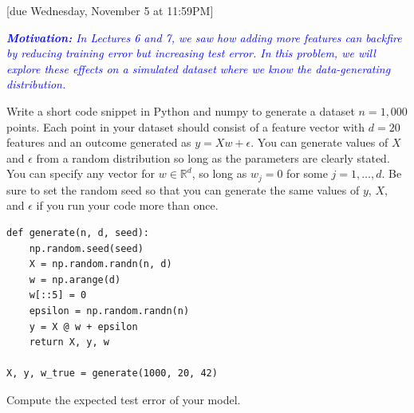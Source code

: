 \documentclass{article}
\newcommand{\R}{\mathbb{R}}
\begin{document}
[due Wednesday, November 5 at 11:59PM]

\begin{probset}
\begin{prob}
    \textit{\textcolor{blue}{\textbf{Motivation:} In Lectures 6 and 7, we saw how adding more features can backfire by reducing training error but increasing test error. In this problem, we will explore these effects on a simulated dataset where we know the data-generating distribution.}}

    \begin{subprobset}
        \begin{subprob}
            Write a short code snippet in Python and numpy to generate a dataset $n = 1,000$ points. Each point in your dataset should consist of a feature vector with $d = 20$ features and an outcome generated as $y = Xw + \epsilon$. You can generate values of $X$ and $\epsilon$ from a random distribution so long as the parameters are clearly stated. You can specify any vector for $w \in \R^d$, so long as $w_j = 0$ for some $j = 1, \ldots, d$. Be sure to set the random seed so that you can generate the same values of $y$, $X$, and $\epsilon$ if you run your code more than once.

            \begin{verbatim}
def generate(n, d, seed):
    np.random.seed(seed)
    X = np.random.randn(n, d)
    w = np.arange(d)
    w[::5] = 0
    epsilon = np.random.randn(n)
    y = X @ w + epsilon
    return X, y, w

X, y, w_true = generate(1000, 20, 42)
            \end{verbatim}
        \end{subprob}

        \begin{subprob}
            Compute the expected test error of your model.


\end{subprob}
\end{subprobset}
\end{prob}
\end{probset}
\end{document}
